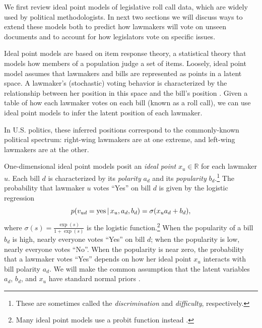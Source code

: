 We first review ideal point models of legislative roll call data,
which are widely used by political methodologists.  In next two
sections we will discuss ways to extend these models both to predict
how lawmakers will vote on unseen documents and to account for how
legislators vote on specific issues.

Ideal point models are based on item response theory, a statistical
theory that models how members of a population judge a set of items.
Loosely, ideal point model assumes that lawmakers and bills are
represented as points in a latent space.  A lawmaker's (stochastic)
voting behavior is characterized by the relationship between her
position in this space and the bill's position
\cite{poole:1985,poole:1991,jackman:2001,martin:2002,clinton:2004}.
Given a table of how each lawmaker votes on each bill (known as a roll
call), we can use ideal point models to infer the latent position of
each lawmaker.

In U.S. politics, these inferred positions correspond to the commonly-known
political spectrum: right-wing lawmakers are at one extreme, and
left-wing lawmakers are at the other. %


One-dimensional ideal point models posit an \textit{ideal point} $x_u
\in \mathbb{R}$ for each lawmaker $u$.  Each bill $d$ is characterized
by its \textit{polarity} $a_d$ and its \textit{popularity} $b_d$.\footnote{These are sometimes called the \emph{discrimination} and \emph{difficulty}, respectively.}  The
probability that lawmaker $u$ votes ``Yes'' on bill $d$ is given by
the logistic regression
\begin{equation}
  \label{eq:trad_ipm}
  p(v_{ud} = \textrm{yes} \, | \, x_u, a_d, b_d) =
  \sigma(x_u a_d + b_d),
\end{equation}
where $\sigma(s) = \frac{\exp(s)}{1 + \exp(s)}$ is the logistic
function.\footnote{Many ideal point models use a probit function instead \cite{poole:1991,clinton:2004}.}
When the popularity of a bill $b_d$ is high, nearly everyone votes
``Yes'' on bill $d$; when the popularity is low, nearly everyone votes
``No''.  When the popularity is near zero, the probability that a
lawmaker votes ``Yes'' depends on how her ideal point $x_u$ interacts
with bill polarity $a_d$.  We will make the common assumption that the
latent variables $a_d$, $b_d$, and $x_u$ have standard normal priors
\cite{clinton:2004}.



